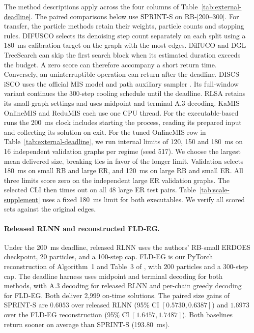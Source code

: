 The method descriptions apply across the four columns of Table~\ref{tab:external-deadline}. The paired comparisons below use SPRINT-S on RB-[200--300]. For transfer, the particle methods retain their weights, particle counts and stopping rules. DIFUSCO selects its denoising step count separately on each split using a 180~ms calibration target on the graph with the most edges. DiffUCO and DGL-TreeSearch can skip the first search block when its estimated duration exceeds the budget. A zero score can therefore accompany a short return time. Conversely, an uninterruptible operation can return after the deadline.
DISCS iSCO uses the official MIS model and path auxiliary sampler \citep{sun2023revisiting,goshvadi2023discs}. Its full-window variant continues the 300-step cooling schedule until the deadline. RLSA retains its small-graph settings and uses midpoint and terminal A.3 decoding. KaMIS OnlineMIS \citep{dahlum2016accelerating} and ReduMIS \citep{lamm2017finding} each use one CPU thread. For the executable-based runs the 200~ms clock includes starting the process, reading its prepared input and collecting its solution on exit. For the tuned OnlineMIS row in Table~\ref{tab:external-deadline}, we run internal limits of 120, 150 and 180~ms on 16 independent validation graphs per regime (seed 517). We choose the largest mean delivered size, breaking ties in favor of the longer limit. Validation selects 180~ms on small RB and large ER, and 120~ms on large RB and small ER. All three limits score zero on the independent large ER validation graphs. The selected CLI then times out on all 48 large ER test pairs. Table~\ref{tab:scale-supplement} uses a fixed 180~ms limit for both executables. We verify all scored sets against the original edges.

\paragraph{Released RLNN and reconstructed FLD-EG.}
Under the 200~ms deadline, released RLNN uses the authors' RB-small ERDOES checkpoint, 20 particles, and a 100-step cap. FLD-EG is our PyTorch reconstruction of Algorithm~1 and Table~3 of \citet{wang2025fractional}, with 200 particles and a 300-step cap. The deadline harness uses midpoint and terminal decoding for both methods, with A.3 decoding for released RLNN and per-chain greedy decoding for FLD-EG. Both deliver 2,999 on-time solutions. The paired size gains of SPRINT-S are \(0.6053\) over released RLNN (95\% CI \([0.5730,0.6387]\)) and \(1.6973\) over the FLD-EG reconstruction (95\% CI \([1.6457,1.7487]\)). Both baselines return sooner on average than SPRINT-S (193.80~ms).

